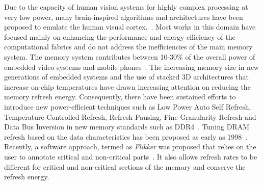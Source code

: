 
Due to the capacity of human vision systems for highly complex processing at very low power, many brain-inspired algorithms and architectures have been proposed to emulate the human visual cortex.~\cite{Nere2011,Chen2014,Kestur2012}. %
Most works in this domain have focused mainly on enhancing the performance and energy efficiency of the computational fabrics and do not address the inefficiencies of the main memory system. The memory system contributes between 10-30\% of the overall power of embedded video systems and mobile phones~\cite{CarrollAaronHeiser2010}. The increasing memory size in new generations of embedded systems and the use of stacked 3D architectures that increase on-chip temperatures have drawn increasing attention on reducing the memory refresh energy. Consequently, there have been sustained efforts to introduce new power-efficient techniques such as Low Power Auto Self Refresh, Temperature Controlled Refresh, Refresh Pausing, Fine Granularity Refresh and Data Bus Inversion in new memory standards such as DDR4~\cite{jedec-sdram-standards}.  
Tuning DRAM refresh based on the data characteristics has been proposed as early as 1998~\cite{islped98}. Recently, a software approach, termed as \emph{Flikker} was proposed that relies on the user to annotate critical and non-critical parts~\cite{Liu2011}. It also allows refresh rates to be different for critical and non-critical sections of the memory and conserve the refresh energy. 

